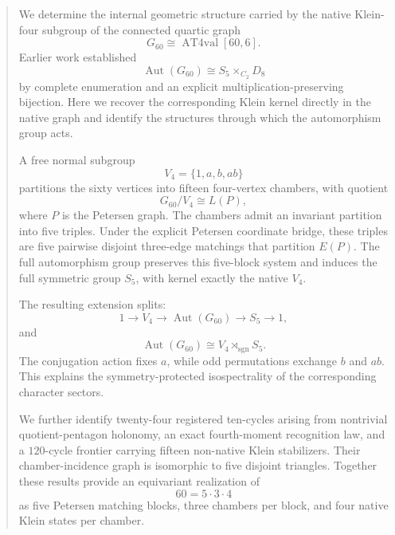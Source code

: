 \begin{abstract}
We determine the internal geometric structure carried by the native
Klein-four subgroup of the connected quartic graph
\[
G_{60}\cong \operatorname{AT4val}[60,6].
\]
Earlier work established
\[
\operatorname{Aut}(G_{60})
\cong S_5\times_{C_2}D_8
\]
by complete enumeration and an explicit multiplication-preserving
bijection. Here we recover the corresponding Klein kernel directly in
the native graph and identify the structures through which the
automorphism group acts.

A free normal subgroup
\[
V_4=\{1,a,b,ab\}
\]
partitions the sixty vertices into fifteen four-vertex chambers, with
quotient
\[
G_{60}/V_4\cong L(P),
\]
where \(P\) is the Petersen graph. The chambers admit an invariant
partition into five triples. Under the explicit Petersen coordinate
bridge, these triples are five pairwise disjoint three-edge matchings
that partition \(E(P)\). The full automorphism group preserves this
five-block system and induces the full symmetric group \(S_5\), with
kernel exactly the native \(V_4\).

The resulting extension splits:
\[
1\longrightarrow V_4
\longrightarrow \operatorname{Aut}(G_{60})
\longrightarrow S_5
\longrightarrow 1,
\]
and
\[
\operatorname{Aut}(G_{60})
\cong V_4\rtimes_{\operatorname{sgn}}S_5.
\]
The conjugation action fixes \(a\), while odd permutations exchange
\(b\) and \(ab\). This explains the symmetry-protected isospectrality
of the corresponding character sectors.

We further identify twenty-four registered ten-cycles arising from
nontrivial quotient-pentagon holonomy, an exact fourth-moment
recognition law, and a \(120\)-cycle frontier carrying fifteen
non-native Klein stabilizers. Their chamber-incidence graph is
isomorphic to five disjoint triangles. Together these results provide
an equivariant realization of
\[
60=5\cdot3\cdot4
\]
as five Petersen matching blocks, three chambers per block, and four
native Klein states per chamber.
\end{abstract}
